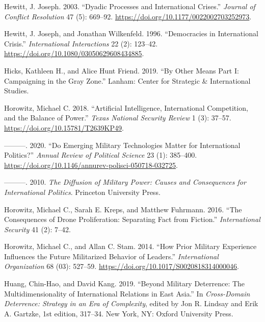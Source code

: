 \documentclass[
]{article}
\begin{document}
\leavevmode\hypertarget{ref-hewitt_dyadicprocessesinternational_2003}{}%
Hewitt, J. Joseph. 2003. ``Dyadic Processes and International Crises.'' \emph{Journal of Conflict Resolution} 47 (5): 669--92. \url{https://doi.org/10.1177/0022002703252973}.

\leavevmode\hypertarget{ref-hewitt_democraciesinternationalcrisis_1996}{}%
Hewitt, J. Joseph, and Jonathan Wilkenfeld. 1996. ``Democracies in International Crisis.'' \emph{International Interactions} 22 (2): 123--42. \url{https://doi.org/10.1080/03050629608434885}.

\leavevmode\hypertarget{ref-hicks_othermeanspart_2019}{}%
Hicks, Kathleen H., and Alice Hunt Friend. 2019. ``By Other Means Part I: Campaigning in the Gray Zone.'' Lanham: Center for Strategic \& International Studies.

\leavevmode\hypertarget{ref-horowitz_artificialintelligenceinternational_2018}{}%
Horowitz, Michael C. 2018. ``Artificial Intelligence, International Competition, and the Balance of Power.'' \emph{Texas National Security Review} 1 (3): 37--57. \url{https://doi.org/10.15781/T2639KP49}.

\leavevmode\hypertarget{ref-horowitz_emergingmilitarytechnologies_2020}{}%
---------. 2020. ``Do Emerging Military Technologies Matter for International Politics?'' \emph{Annual Review of Political Science} 23 (1): 385--400. \url{https://doi.org/10.1146/annurev-polisci-050718-032725}.

\leavevmode\hypertarget{ref-horowitz_diffusionmilitarypower_2010}{}%
---------. 2010. \emph{The Diffusion of Military Power: Causes and Consequences for International Politics}. Princeton University Press.

\leavevmode\hypertarget{ref-horowitz_consequencesdroneproliferation_2016}{}%
Horowitz, Michael C., Sarah E. Kreps, and Matthew Fuhrmann. 2016. ``The Consequences of Drone Proliferation: Separating Fact from Fiction.'' \emph{International Security} 41 (2): 7--42.

\leavevmode\hypertarget{ref-horowitz_howpriormilitary_2014}{}%
Horowitz, Michael C., and Allan C. Stam. 2014. ``How Prior Military Experience Influences the Future Militarized Behavior of Leaders.'' \emph{International Organization} 68 (03): 527--59. \url{https://doi.org/10.1017/S0020818314000046}.

\leavevmode\hypertarget{ref-huang_militarydeterrencemultidimensionality_2019}{}%
Huang, Chin-Hao, and David Kang. 2019. ``Beyond Military Deterrence: The Multidimensionality of International Relations in East Asia.'' In \emph{Cross-Domain Deterrence: Strategy in an Era of Complexity}, edited by Jon R. Lindsay and Erik A. Gartzke, 1st edition, 317--34. New York, NY: Oxford University Press.
\end{document}
